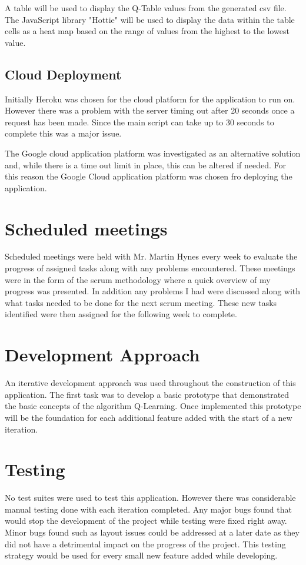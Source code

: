 A table will be used to display the Q-Table values from the generated csv file.
The JavaScript library "Hottie" will be used to display the data within the table cells as a heat map based on the range of values from the highest to the lowest value.
\subsection{Cloud Deployment}
Initially Heroku was chosen for the cloud platform for the application to run on. However there was a problem with the server timing out after 20 seconds once a request has been made. Since the main script can take up to 30 seconds to complete this was a major issue.

The Google cloud application platform was investigated as an alternative solution and, while there is a time out limit in place, this can be altered if needed. For this reason the Google Cloud application platform was chosen fro deploying the application. 

\section {Scheduled meetings}
Scheduled meetings were held with Mr. Martin Hynes every week to evaluate the progress of assigned tasks along with any problems encountered. These meetings were in the form of the scrum methodology where a quick overview of my progress was presented. In addition any problems I had were discussed along with what tasks needed to be done for the next scrum meeting. 
These new tasks identified were then assigned for the following week to complete.

\section{Development Approach}
An iterative development approach was used throughout the construction of this application. The first task was to develop a basic prototype that demonstrated the basic concepts of the algorithm Q-Learning. Once implemented this prototype will be the foundation for each additional feature added with the start of a new iteration.  
\section{Testing}
No test suites were used to test this application. However there was considerable manual testing done with each iteration completed. Any major bugs found that would stop the development of the project while testing were fixed right away. Minor bugs found such as layout issues could be addressed at a later date as they did not have a detrimental impact on the progress of the project. This testing strategy would be used for every small new feature added while developing. 
